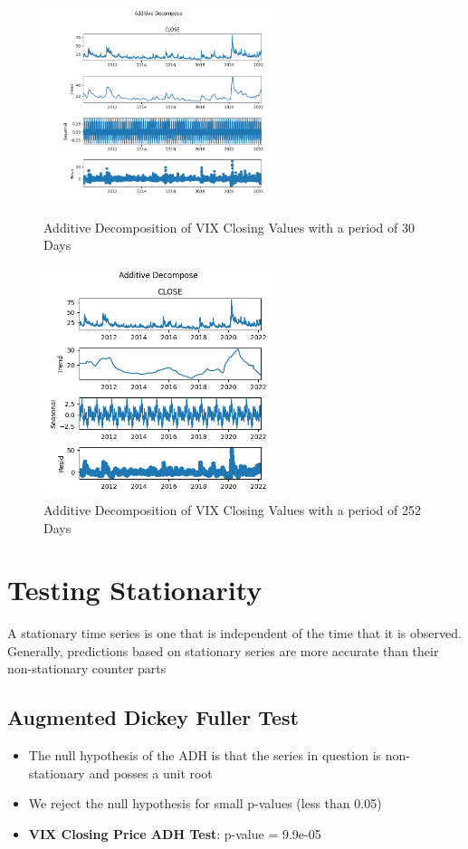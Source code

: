 \documentclass{article}
\begin{document}
\begin{figure}[h!]
    \centering
    \includegraphics[width= 0.6\textwidth]{VIX_additive_decomp_30_2010}
    \caption{Additive Decomposition of VIX Closing Values with a period of 30 Days}
    \includegraphics[width= 0.6\textwidth]{VIX_additive_decomp_252_2010}
    \caption{Additive Decomposition of VIX Closing Values with a period of 252 Days}
\end{figure}

\newpage

\section{Testing Stationarity}

A stationary time series is one that is independent of the time that it is observed. \\
Generally, predictions based on stationary series are more accurate than their non-stationary counter parts

\subsection{Augmented Dickey Fuller Test}
\begin{itemize}
    \item The null hypothesis of the ADH is that the series in question is non-stationary and posses a unit root
    \item We reject the null hypothesis for small p-values (less than 0.05)
    \item \textbf{VIX Closing Price ADH Test}: p-value = 9.9e-05
\end{itemize}
\end{document}
